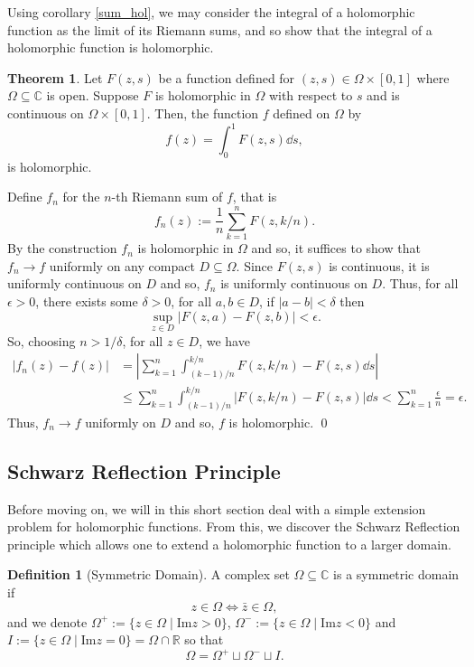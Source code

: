 \documentclass[
]{article}
\theoremstyle{definition}
\newtheorem{theorem}{Theorem}
\theoremstyle{definition}
\newtheorem{definition}{Definition}[section]
\begin{document}
Using corollary \ref{sum_hol}, we may consider the integral of a
holomorphic function as the limit of its Riemann sums, and so show that
the integral of a holomorphic function is holomorphic.

\begin{theorem}
  Let \(F(z, s)\) be a function defined for \((z, s) \in \Omega \times [0, 1]\) 
  where \(\Omega \subseteq \mathbb{C}\) is open. Suppose \(F\) is holomorphic 
  in \(\Omega\) with respect to \(s\) and is continuous on \(\Omega \times [0, 1]\).
  Then, the function \(f\) defined on \(\Omega\) by 
  \[f(z) = \int_0^1 F(z, s) \dd s,\]
  is holomorphic.
\end{theorem}
\proof

Define \(f_n\) for the \(n\)-th Riemann sum of \(f\), that is
\[f_n(z) := \frac{1}{n}\sum_{k = 1}^n F(z, k / n).\] By the construction
\(f_n\) is holomorphic in \(\Omega\) and so, it suffices to show that
\(f_n \to f\) uniformly on any compact \(D \subseteq \Omega\). Since
\(F(z, s)\) is continuous, it is uniformly continuous on \(D\) and so,
\(f_n\) is uniformly continuous on \(D\). Thus, for all
\(\epsilon > 0\), there exists some \(\delta > 0\), for all
\(a, b \in D\), if \(|a - b| < \delta\) then
\[\sup_{z \in D}| F(z, a) - F(z, b) | < \epsilon.\] So, choosing
\(n > 1 / \delta\), for all \(z \in D\), we have \[\begin{split}
    |f_n(z) - f(z)| 
      & = \left| \sum_{k = 1}^n \int_{(k - 1) / n}^{k / n} F(z, k / n) - F(z, s) \dd s\right|\\
      & \le \sum_{k = 1}^n \int_{(k - 1) / n}^{k / n} |F(z, k / n) - F(z, s)| \dd s
        < \sum_{k = 1}^n \frac{\epsilon}{n} = \epsilon.
  \end{split}\] Thus, \(f_n \to f\) uniformly on \(D\) and so, \(f\) is
holomorphic. \qed

\hypertarget{schwarz-reflection-principle}{%
\subsection{Schwarz Reflection
Principle}\label{schwarz-reflection-principle}}

Before moving on, we will in this short section deal with a simple
extension problem for holomorphic functions. From this, we discover the
Schwarz Reflection principle which allows one to extend a holomorphic
function to a larger domain.

\begin{definition}[Symmetric Domain]
  A complex set \(\Omega \subseteq \mathbb{C}\) is a symmetric domain if 
  \[z \in \Omega \iff \bar{z} \in \Omega,\]
  and we denote \(\Omega^+ := \{z \in \Omega \mid \text{Im} z > 0\}\),
  \(\Omega^- :=  \{z \in \Omega \mid \text{Im} z < 0\}\) and 
  \(I := \{z \in \Omega \mid \text{Im} z = 0\} = \Omega \cap \mathbb{R}\) so that 
  \[\Omega = \Omega^+ \sqcup \Omega^- \sqcup I.\]
\end{definition}
\end{document}
